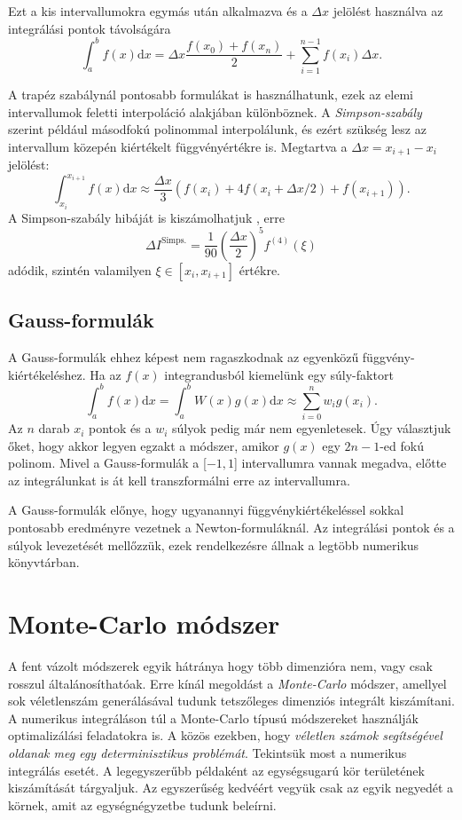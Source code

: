 \documentclass[12pt]{article}
\theoremstyle{plain}
\begin{document}
Ezt a kis intervallumokra egymás után alkalmazva és a $\Delta x$ jelölést használva az integrálási pontok távolságára
\begin{equation}
    \int_a^b f(x) \text{d}x  = \Delta x  \frac{f(x_0) + f(x_n)}{2} + \sum_{i = 1} ^{n-1}f(x_i)\Delta x.
\end{equation}

A trapéz szabálynál pontosabb formulákat is használhatunk, ezek az elemi intervallumok feletti interpoláció alakjában különböznek. 
A {\em Simpson-szabály} szerint például másodfokú polinommal interpolálunk, és ezért szükség lesz az intervallum közepén kiértékelt függvényértékre is. Megtartva a $\Delta x = x_{i+1} - x_i$ jelölést:
\begin{equation}
    \int_{x_{i}}^{x_{i+1}} f(x) \text{d}x \approx \frac{\Delta x}{3}\left( f(x_i) + 4f(x_i+\Delta x/2) + f(x_{i+1})\right).
\end{equation}
A Simpson-szabály hibáját is kiszámolhatjuk \cite{error}, erre
$$
\Delta I ^{\text{Simps.}} = \frac{1}{90}\left(\frac{\Delta x}{2}\right)^5 f^{(4)}(\xi) 
$$
adódik, szintén valamilyen $\xi \in [x_i, x_{i+1}]$ értékre. 
\subsection{Gauss-formulák}
A Gauss-formulák ehhez képest nem ragaszkodnak az egyenközű függvény-kiértékeléshez. Ha az $f(x)$ integrandusból kiemelünk egy súly-faktort
\begin{equation}
    \label{nc}
    \int_a^b f(x) \text{d}x  = \int_a^b W(x)g(x) \text{d}x \approx \sum_{i=0} ^n w_i g(x_i).
\end{equation}
Az $n$ darab $x_i$ pontok és a $w_i$ súlyok pedig már nem egyenletesek. Úgy választjuk őket, hogy akkor legyen egzakt a módszer, amikor $g(x)$ egy $2n-1$-ed fokú polinom. Mivel a Gauss-formulák a [$-1, 1$] intervallumra vannak megadva, előtte az integrálunkat is át kell transzformálni erre az intervallumra. 

A Gauss-formulák előnye, hogy ugyanannyi függvénykiértékeléssel sokkal pontosabb eredményre vezetnek a Newton-formuláknál. Az integrálási pontok és a súlyok levezetését mellőzzük, ezek rendelkezésre állnak a legtöbb numerikus könyvtárban. 
\section{Monte-Carlo módszer}
A fent vázolt módszerek egyik hátránya hogy több dimenzióra nem, vagy csak rosszul általánosíthatóak. Erre kínál megoldást a {\em Monte-Carlo} módszer, amellyel sok véletlenszám generálásával tudunk tetszőleges dimenziós integrált kiszámítani. A numerikus integráláson túl a Monte-Carlo típusú módszereket használják optimalizálási feladatokra is. A közös ezekben, hogy {\em véletlen számok segítségével oldanak meg egy determinisztikus problémát}. Tekintsük most a numerikus integrálás esetét. A legegyszerűbb példaként az egységsugarú kör területének kiszámítását tárgyaljuk. Az egyszerűség kedvéért vegyük csak az egyik negyedét a körnek, amit az egységnégyzetbe tudunk beleírni. 
\end{document}
